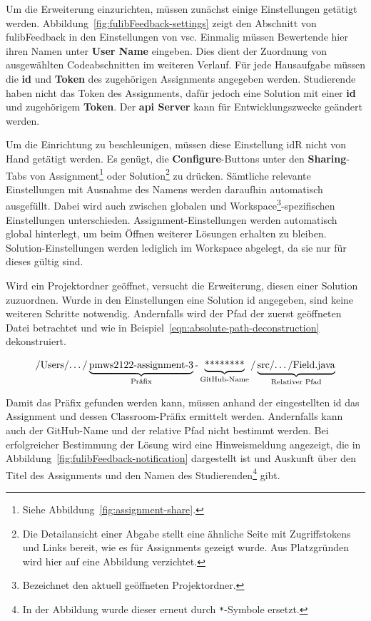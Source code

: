 Um die Erweiterung einzurichten, müssen zunächst einige Einstellungen getätigt werden.
Abbildung~\ref{fig:fulibFeedback-settings} zeigt den Abschnitt von fulibFeedback in den Einstellungen von \ac{vsc}.
Einmalig müssen Bewertende hier ihren Namen unter \textbf{User Name} eingeben.
Dies dient der Zuordnung von ausgewählten Codeabschnitten im weiteren Verlauf.
Für jede Hausaufgabe müssen die \textbf{\acs{id}} und \textbf{Token} des zugehörigen Assignments angegeben werden.
Studierende haben nicht das Token des Assignments, dafür jedoch eine Solution mit einer \textbf{\acs{id}} und zugehörigem \textbf{Token}.
Der \textbf{\acs{api} Server} kann für Entwicklungszwecke geändert werden.

Um die Einrichtung zu beschleunigen, müssen diese Einstellung \ac{idR} nicht von Hand getätigt werden.
Es genügt, die \textbf{Configure}-Buttons unter den \textbf{Sharing}-Tabs von Assignment\footnote{
    Siehe Abbildung~\ref{fig:assignment-share}.
} oder Solution\footnote{
    Die Detailansicht einer Abgabe stellt eine ähnliche Seite mit Zugriffstokens und Links bereit, wie es für Assignments gezeigt wurde.
    Aus Platzgründen wird hier auf eine Abbildung verzichtet.
} zu drücken.
Sämtliche relevante Einstellungen mit Ausnahme des Namens werden daraufhin automatisch ausgefüllt.
Dabei wird auch zwischen globalen und Workspace\footnote{
    Bezeichnet den aktuell geöffneten Projektordner.
}-spezifischen Einstellungen unterschieden.
Assignment-Einstellungen werden automatisch global hinterlegt, um beim Öffnen weiterer Lösungen erhalten zu bleiben.
Solution-Einstellungen werden lediglich im Workspace abgelegt, da sie nur für dieses gültig sind.

Wird ein Projektordner geöffnet, versucht die Erweiterung, diesen einer Solution zuzuordnen.
Wurde in den Einstellungen eine Solution \acs{id} angegeben, sind keine weiteren Schritte notwendig.
Andernfalls wird der Pfad der zuerst geöffneten Datei betrachtet und wie in Beispiel~\ref{eqn:absolute-path-deconstruction} dekonstruiert.

\begin{equation}\label{eqn:absolute-path-deconstruction}
    \text{/Users/\dots/}
    \underbrace{\text{pmws2122-assignment-3}}_{\text{Präfix}}
    \text{-}
    \underbrace{\text{********}}_{\text{GitHub-Name}}
    \text{/}
    \underbrace{\text{src/\dots/Field.java}}_{\text{Relativer Pfad}}
\end{equation}

Damit das Präfix gefunden werden kann, müssen anhand der eingestellten \acs{id} das Assignment und dessen Classroom-Präfix ermittelt werden.
Andernfalls kann auch der GitHub-Name und der relative Pfad nicht bestimmt werden.
Bei erfolgreicher Bestimmung der Lösung wird eine Hinweismeldung angezeigt, die in Abbildung~\ref{fig:fulibFeedback-notification} dargestellt ist und Auskunft über den Titel des Assignments und den Namen des Studierenden\footnote{
    In der Abbildung wurde dieser erneut durch \texttt{*}-Symbole ersetzt.
} gibt.

